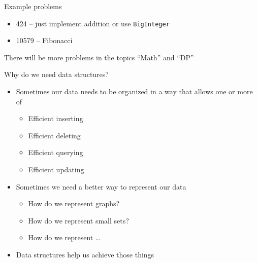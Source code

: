 \documentclass[12pt,t]{beamer}
\newcommand{\bi}{\begin{itemize}}
\newcommand{\ei}{\end{itemize}}
\begin{document}
\begin{frame}{Example problems}
    \bi
        \item 424 -- just implement addition or use \texttt{BigInteger}
        \item 10579 -- Fibonacci
    \ei
    
    There will be more problems in the topics ``Math'' and ``DP''
\end{frame}


\begin{frame}{Why do we need data structures?}
    \bi
        \vspace{25pt}

        \item Sometimes our data needs to be organized in a way that allows one or more of
            \bi
                \item Efficient inserting
                \item Efficient deleting
                \item Efficient querying
                \item Efficient updating
            \ei
        \item Sometimes we need a better way to represent our data
            \bi
                \item How do we represent graphs?
                \item How do we represent small sets?
                \item How do we represent \dots
            \ei

        \item Data structures help us achieve those things
    \ei
\end{frame}
\end{document}
